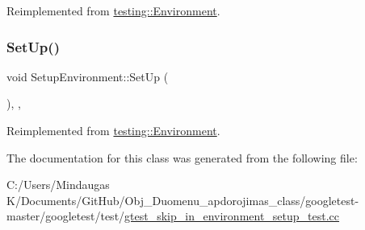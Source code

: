 Reimplemented from \mbox{\hyperlink{classtesting_1_1_environment_a1bf8cafaa9d4eba9feb98655ee434eb3}{testing\+::\+Environment}}.

\mbox{\label{class_setup_environment_a02995e3c2581a49c9dd0526d80072b38}} 
\subsubsection{\texorpdfstring{SetUp()}{SetUp()}\hspace{0.1cm}{\footnotesize\ttfamily [2/2]}}
{\footnotesize\ttfamily void Setup\+Environment\+::\+Set\+Up (\begin{DoxyParamCaption}{ }\end{DoxyParamCaption})\hspace{0.3cm}{\ttfamily [inline]}, {\ttfamily [override]}, {\ttfamily [virtual]}}



Reimplemented from \mbox{\hyperlink{classtesting_1_1_environment_a1bf8cafaa9d4eba9feb98655ee434eb3}{testing\+::\+Environment}}.



The documentation for this class was generated from the following file\+:\begin{DoxyCompactItemize}
\item 
C\+:/\+Users/\+Mindaugas K/\+Documents/\+Git\+Hub/\+Obj\+\_\+\+Duomenu\+\_\+apdorojimas\+\_\+class/googletest-\/master/googletest/test/\mbox{\hyperlink{googletest-master_2googletest_2test_2gtest__skip__in__environment__setup__test_8cc}{gtest\+\_\+skip\+\_\+in\+\_\+environment\+\_\+setup\+\_\+test.\+cc}}\end{DoxyCompactItemize}
